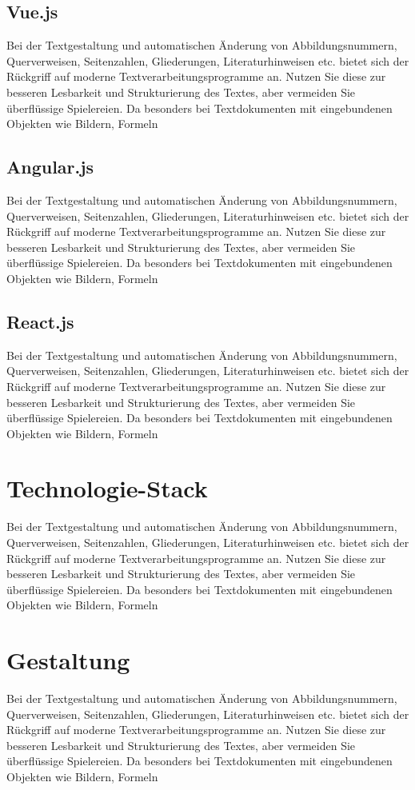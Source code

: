 \subsection{Vue.js}
Bei der Textgestaltung und automatischen Änderung von Abbildungsnummern, Querverweisen,
Seitenzahlen, Gliederungen, Literaturhinweisen etc. bietet sich der Rückgriff
auf moderne Textverarbeitungsprogramme an. Nutzen Sie diese zur besseren Lesbarkeit
und Strukturierung des Textes, aber vermeiden Sie überflüssige Spielereien. Da
besonders bei Textdokumenten mit eingebundenen Objekten wie Bildern, Formeln

\subsection{Angular.js}
Bei der Textgestaltung und automatischen Änderung von Abbildungsnummern, Querverweisen,
Seitenzahlen, Gliederungen, Literaturhinweisen etc. bietet sich der Rückgriff
auf moderne Textverarbeitungsprogramme an. Nutzen Sie diese zur besseren Lesbarkeit
und Strukturierung des Textes, aber vermeiden Sie überflüssige Spielereien. Da
besonders bei Textdokumenten mit eingebundenen Objekten wie Bildern, Formeln

\subsection{React.js}
Bei der Textgestaltung und automatischen Änderung von Abbildungsnummern, Querverweisen,
Seitenzahlen, Gliederungen, Literaturhinweisen etc. bietet sich der Rückgriff
auf moderne Textverarbeitungsprogramme an. Nutzen Sie diese zur besseren Lesbarkeit
und Strukturierung des Textes, aber vermeiden Sie überflüssige Spielereien. Da
besonders bei Textdokumenten mit eingebundenen Objekten wie Bildern, Formeln

\section{Technologie-Stack}
Bei der Textgestaltung und automatischen Änderung von Abbildungsnummern, Querverweisen,
Seitenzahlen, Gliederungen, Literaturhinweisen etc. bietet sich der Rückgriff
auf moderne Textverarbeitungsprogramme an. Nutzen Sie diese zur besseren Lesbarkeit
und Strukturierung des Textes, aber vermeiden Sie überflüssige Spielereien. Da
besonders bei Textdokumenten mit eingebundenen Objekten wie Bildern, Formeln

\section{Gestaltung}
Bei der Textgestaltung und automatischen Änderung von Abbildungsnummern, Querverweisen,
Seitenzahlen, Gliederungen, Literaturhinweisen etc. bietet sich der Rückgriff
auf moderne Textverarbeitungsprogramme an. Nutzen Sie diese zur besseren Lesbarkeit
und Strukturierung des Textes, aber vermeiden Sie überflüssige Spielereien. Da
besonders bei Textdokumenten mit eingebundenen Objekten wie Bildern, Formeln
